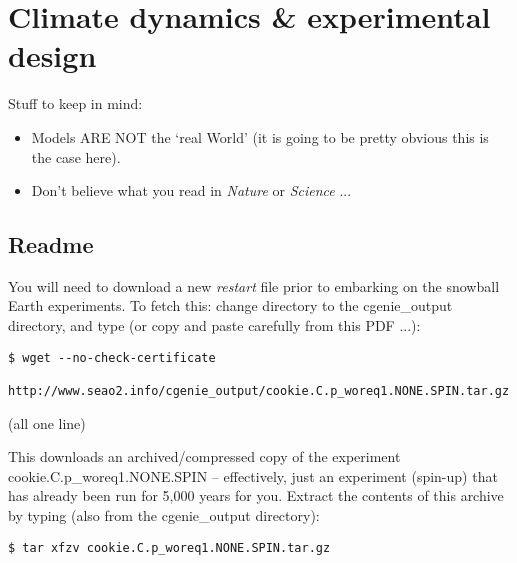 
\cleardoublepage


\chapter{Climate dynamics \& experimental design}\label{ch:climate-dynamics}

\hfill \break

\noindent Stuff to keep in mind:

\vspace{2mm}
\begin{itemize}
\item Models ARE NOT the ‘real World’ (it is going to be pretty obvious this is the case here).
\item Don’t believe what you read in \textit{Nature} or \textit{Science} ...
\end{itemize}

\newpage

\section*{Readme}

You will need to download a new \textit{restart} file prior to embarking on the snowball Earth experiments.
To fetch this: change directory to the \textsf{\footnotesize cgenie\_output} directory, and type (or copy and paste carefully from this PDF ...):
\vspace{-2mm}\small\begin{verbatim}
$ wget --no-check-certificate 
  http://www.seao2.info/cgenie_output/cookie.C.p_woreq1.NONE.SPIN.tar.gz
\end{verbatim}\normalsize\vspace{-2mm}
(all one line)

\vspace{1mm}
This downloads an archived/compressed copy of the experiment \textsf{\footnotesize cookie.C.p\_woreq1.NONE.SPIN} – effectively, just an experiment (spin-up) that has already been run for 5,000 years for you. Extract the contents of this archive by typing (also from the \textsf{\footnotesize cgenie\_output} directory):
\vspace{-2mm}\small\begin{verbatim}
$ tar xfzv cookie.C.p_woreq1.NONE.SPIN.tar.gz
\end{verbatim}\normalsize\vspace{-2mm}

